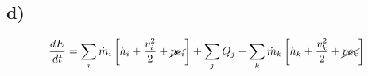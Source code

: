 

\subsection*{d)}

\[
\frac{dE}{dt} = \sum_i \dot{m}_i \left[ h_i + \frac{v_i^2}{2} + \cancel{pe_i} \right] + \sum_j Q_j - \sum_k \dot{m}_k \left[ h_k + \frac{v_k^2}{2} + \cancel{pe_k} \right]
\]